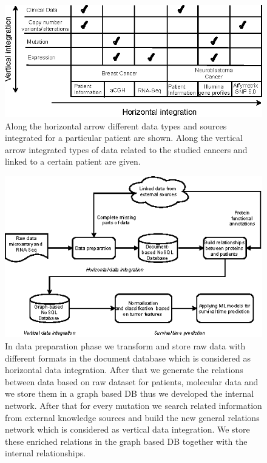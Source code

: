 \documentclass{bmcart}
\begin{document}
\begin{backmatter}
\begin{figure}[h!]
  \centering
  \includegraphics{Fig2.eps}
  \caption{
     Along the horizontal arrow different
data types and sources integrated for a particular patient are shown.
Along the vertical arrow integrated types of data related to the
studied cancers and linked to a certain patient are given. 
  }
  \label{figure_2}
\end{figure}



\begin{figure}[h!]
  \centering
  \includegraphics{Fig3.eps}
  \caption{
    In data preparation phase we transform and store raw data with different formats in the document database which is considered as horizontal data integration. After that we generate the relations between data based on raw dataset for patients, molecular data and we store them in a graph based DB thus we developed the internal network. After that for every mutation we search related information from external knowledge sources and build the new general relations network which is considered as vertical data integration. We store these enriched relations in the graph based DB together with the internal relationships.
  }
  \label{figure_3}
\end{figure}




\end{backmatter}
\end{document}
